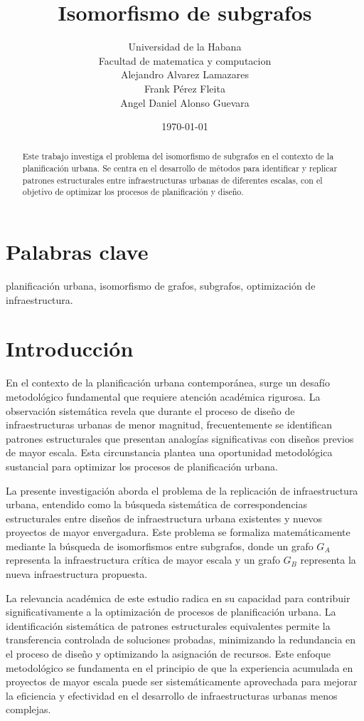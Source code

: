 \documentclass[12pt,a4paper]{article}
\title{Isomorfismo de subgrafos}
\author{
    Universidad de la Habana\\
    Facultad de matematica y computacion\\
    Alejandro Alvarez Lamazares\\
    Frank Pérez Fleita\\
    Angel Daniel Alonso Guevara \\
}
\date{\today}
\begin{document}
\maketitle
\begin{abstract}
Este trabajo investiga el problema del isomorfismo de subgrafos en el contexto de la planificación urbana. Se centra en el desarrollo de métodos para identificar y replicar patrones estructurales entre infraestructuras urbanas de diferentes escalas, con el objetivo de optimizar los procesos de planificación y diseño.
\end{abstract}

\section*{Palabras clave}
planificación urbana, isomorfismo de grafos, subgrafos, optimización de infraestructura.

\section{Introducción}
En el contexto de la planificación urbana contemporánea, surge un desafío metodológico fundamental que requiere atención académica rigurosa. La observación sistemática revela que durante el proceso de diseño de infraestructuras urbanas de menor magnitud, frecuentemente se identifican patrones estructurales que presentan analogías significativas con diseños previos de mayor escala. Esta circunstancia plantea una oportunidad metodológica sustancial para optimizar los procesos de planificación urbana.

La presente investigación aborda el problema de la replicación de infraestructura urbana, entendido como la búsqueda sistemática de correspondencias estructurales entre diseños de infraestructura urbana existentes y nuevos proyectos de mayor envergadura. Este problema se formaliza matemáticamente mediante la búsqueda de isomorfismos entre subgrafos, donde un grafo $G_A$  representa la infraestructura crítica de mayor escala y un grafo $G_B$ representa la nueva infraestructura propuesta.

La relevancia académica de este estudio radica en su capacidad para contribuir significativamente a la optimización de procesos de planificación urbana. La identificación sistemática de patrones estructurales equivalentes permite la transferencia controlada de soluciones probadas, minimizando la redundancia en el proceso de diseño y optimizando la asignación de recursos. Este enfoque metodológico se fundamenta en el principio de que la experiencia acumulada en proyectos de mayor escala puede ser sistemáticamente aprovechada para mejorar la eficiencia y efectividad en el desarrollo de infraestructuras urbanas menos complejas.
\end{document}
